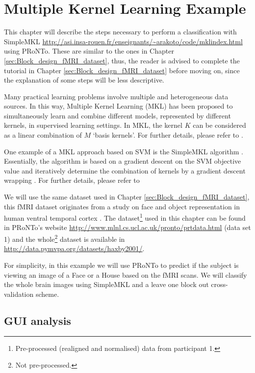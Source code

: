 
\chapter{Multiple Kernel Learning Example}
\label{data_example3}
\minitoc


This chapter will describe the steps necessary to perform a classification with SimpleMKL \url{http://asi.insa-rouen.fr/enseignants/~arakoto/code/mklindex.html} \cite{Rakotomamonjy2008} using PRoNTo. These are similar to the ones in Chapter \ref{sec:Block_design_fMRI_dataset}, thus, the reader is advised to complete the tutorial in Chapter \ref{sec:Block_design_fMRI_dataset}  before moving on, since the explanation of some steps will be less descriptive.

Many practical learning problems involve multiple and heterogeneous data sources. In this way, Multiple Kernel Learning (MKL) \cite{Bach2004} has been proposed to simultaneously learn and combine different models, represented by different kernels, in supervised learning settings. In MKL, the kernel $K$  can  be  considered  as  a  linear  combination  of $M$ `basis kernels'. For further details, please refer to \cite{Bach2004}.

One example of a MKL approach based on SVM is the SimpleMKL algorithm \cite{Rakotomamonjy2008}. Essentially, the algorithm is based on a gradient descent on the SVM objective value and iteratively determine the combination of kernels by a gradient descent wrapping \cite{Rakotomamonjy2008}. For further details, please refer to \cite{Rakotomamonjy2008}

We will use the same dataset used in Chapter \ref{sec:Block_design_fMRI_dataset}, this fMRI dataset originates from a study on face and object representation in human ventral temporal cortex \cite{Haxby2001}. The dataset\footnote{Pre-processed (realigned and normalised) data from participant 1.} used in this chapter can be found in PRoNTo's website \url{http://www.mlnl.cs.ucl.ac.uk/pronto/prtdata.html} (data set 1) and the whole\footnote{Not pre-processed.} dataset is available in \url{http://data.pymvpa.org/datasets/haxby2001/}.

For simplicity, in this example we will use PRoNTo to predict if the subject is viewing an image of a Face or a House based on the fMRI scans. We will classify the whole brain images using SimpleMKL and a leave one block out cross-validation scheme.

\section{GUI analysis}

